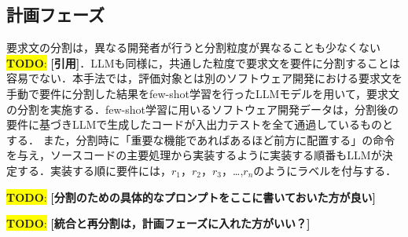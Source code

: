 \documentclass[submit,techrep,noauthor]{ipsj}
\newcommand{\todo}[1]{\colorbox{yellow}{{\bf TODO}:}{\color{red} {\textbf{[#1]}}}}
\begin{document}





\subsection{計画フェーズ}
要求文の分割は，異なる開発者が行うと分割粒度が異なることも少なくない\todo{引用}．LLMも同様に，共通した粒度で要求文を要件に分割することは容易でない．本手法では，評価対象とは別のソフトウェア開発における要求文を手動で要件に分割した結果をfew-shot学習を行ったLLMモデルを用いて，要求文の分割を実施する．few-shot学習に用いるソフトウェア開発データは，分割後の要件に基づきLLMで生成したコードが入出力テストを全て通過しているものとする．
また，分割時に「重要な機能であればあるほど前方に配置する」の命令を与え，ソースコードの主要処理から実装するように実装する順番もLLMが決定する．実装する順に要件には，$r_1$，$r_2$，$r_3$，\dots,$r_n$のようにラベルを付与する．

\todo{分割のための具体的なプロンプトをここに書いておいた方が良い}


\todo{統合と再分割は，計画フェーズに入れた方がいい？}

\end{document}
